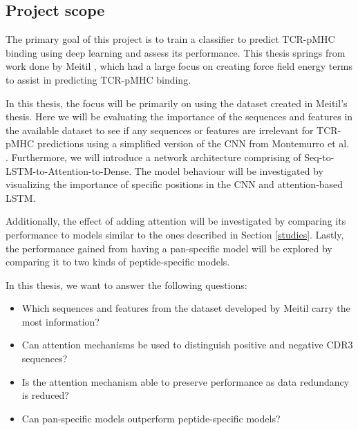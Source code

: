 \subsection{Project scope}
The primary goal of this project is to train a classifier to predict TCR-pMHC binding using deep learning and assess its performance. This thesis springs from work done by Meitil \cite{Meitil2021UsingPrediction}, which had a large focus on creating force field energy terms to assist in predicting TCR-pMHC binding. 

In this thesis, the focus will be primarily on using the dataset created in Meitil's thesis. Here we will be evaluating the importance of the sequences and features in the available dataset to see if any sequences or features are irrelevant for TCR-pMHC predictions using a simplified version of the CNN from Montemurro et al. \cite{Montemurro2021NetTCR-2.0Data}. Furthermore, we will introduce a network architecture comprising of Seq-to-LSTM-to-Attention-to-Dense. The model behaviour will be investigated by visualizing the importance of specific positions in the CNN and attention-based LSTM. 

Additionally, the effect of adding attention will be investigated by comparing its performance to models similar to the ones described in Section \ref{studies}. Lastly, the performance gained from having a pan-specific model will be explored by comparing it to two kinds of peptide-specific models.

In this thesis, we want to answer the following questions:

\begin{itemize}
    \item Which sequences and features from the dataset developed by Meitil carry the most information?
    \item Can attention mechanisms be used to distinguish positive and negative CDR3 sequences?
    \item Is the attention mechanism able to preserve performance as data redundancy is reduced?
    \item Can pan-specific models outperform peptide-specific models?
\end{itemize}